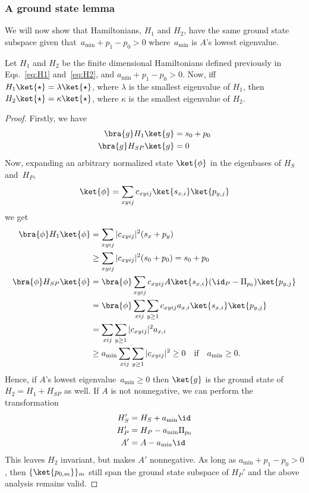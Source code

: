 \documentclass[11pt,oneside,final]{huthesis}%
\begin{document}
\subsubsection*{A ground state lemma}

We will now show that Hamiltonians, $H_1$ and $H_2$, have the same
ground state subspace given that~$a_{\text{min}} +p_1-p_0  > 0$
where~$a_{\text{min}}$ is $A$'s lowest eigenvalue.
\begin{lemma}
Let $H_1$ and $H_2$ be the finite dimensional Hamiltonians defined
previously in Eqs.~\eqref{eq:H1} and~\eqref{eq:H2},
and $a_{\text{min}} +p_1-p_0 > 0$.
Now, iff $H_1 \ket{\star} = \lambda \ket{\star}$, where
$\lambda$ is the smallest eigenvalue of $H_1$,
then
$H_2 \ket{\star} = \kappa \ket{\star}$, where
$\kappa$ is the smallest eigenvalue of $H_2$.
\end{lemma} 

\begin{proof}
Firstly, we have
\begin{align*}
\bra{g} H_1 \ket{g} &= s_0 +p_0\\
\bra{g} H_{SP} \ket{g} &= 0
\end{align*}
Now, expanding an arbitrary normalized state $\ket{\phi}$ in the
eigenbases of $H_S$ and~$H_P$,
\[
\ket{\phi} = \sum_{xyij} c_{xyij} \ket{s_{x,i}}\ket{p_{y,j}}
\]
we get
\begin{align*}
\bra{\phi} H_1 \ket{\phi} &= \sum_{xyij} |c_{xyij}|^2 (s_x +p_y)\\
 &\ge \sum_{xyij} |c_{xyij}|^2 (s_0 +p_0) = s_0 +p_0\\
\bra{\phi} H_{SP} \ket{\phi} &=  \bra{\phi} \sum_{xyij} c_{xyij}  A
\ket{s_{x,i}} (\id_P -\Pi_{p_0}) \ket{p_{y,j}}\\
&= \bra{\phi} \sum_{xij} \sum_{y\ge1} c_{xyij}  a_{x,i} \ket{s_{x,i}}
\ket{p_{y,j}}\\
&= \sum_{xij} \sum_{y\ge1} |c_{xyij}|^2  a_{x,i}\\
&\ge a_{\text{min}} \sum_{xij} \sum_{y\ge1} |c_{xyij}|^2 \ge 0 \quad
\text{if}
\quad a_{\text{min}} \ge 0.
\end{align*}
Hence, if $A$'s lowest eigenvalue~$a_{\text{min}} \ge 0$ then $\ket{g}$ is
the
ground state of~$H_2 = H_1+H_{SP}$ as well. If $A$ is not nonnegative, we
can
perform the transformation
\begin{align*}
H_S' &= H_S +a_{\text{min}} \id\\
H_P' &= H_P -a_{\text{min}} \Pi_{p_0}\\
A' &= A -a_{\text{min}} \id
\end{align*}
This leaves $H_2$ invariant, but makes $A'$ nonnegative.
As long as $a_{\text{min}} +p_1-p_0 > 0$, then $\{\ket{p_{0,m}}\}_m$
still span the ground state subspace of $H_P'$ and the above analysis
remains valid.
\end{proof}
\end{document}
